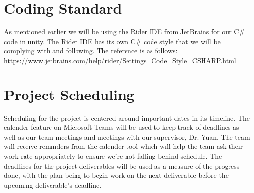 \documentclass{article}
\begin{document}
\section{Coding Standard}

As mentioned earlier we will be using the Rider IDE from JetBrains for our C\# code in unity. The Rider IDE has its own C\# code style that we will be complying with and following. The reference is as follows: \\
\url{https://www.jetbrains.com/help/rider/Settings_Code_Style_CSHARP.html}

\section{Project Scheduling}

Scheduling for the project is centered around important dates in its timeline. The calender feature on Microsoft Teams will be used to keep track of deadlines as well as our team meetings and meetings with our supervisor, Dr. Yuan. The team will receive reminders from the calender tool which will help the team ask their work rate appropriately to ensure we're not falling behind schedule. The deadlines for the project deliverables will be used as a measure of the progress done, with the plan being to begin work on the next deliverable before the upcoming deliverable's deadline.
\end{document}
